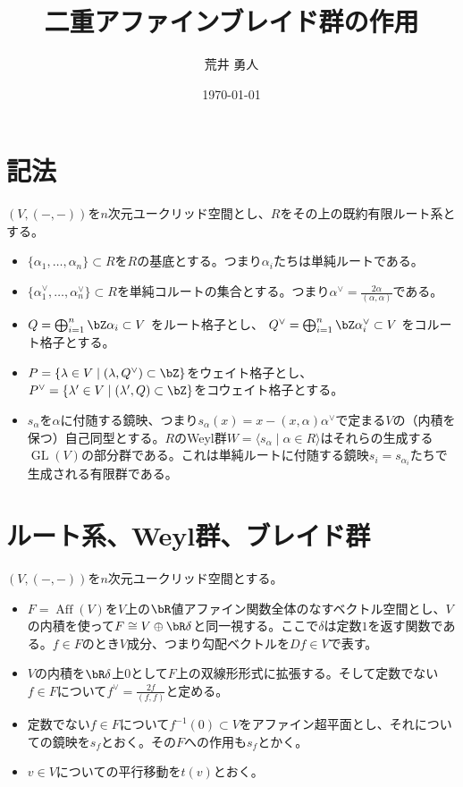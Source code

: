\documentclass[uplatex, a4paper, dvipdfmx]{jsarticle}
\title{二重アファインブレイド群の作用}
\author{荒井 勇人}
\date{\today}
\theoremstyle{definition}
\DeclareMathOperator{\GL}{\mathrm{GL}}
\DeclareMathOperator{\Aff}{\mathrm{Aff}}
\begin{document}
\maketitle


\section{記法}
$(V,(-, -))$を$n$次元ユークリッド空間とし、$R$をその上の既約有限ルート系とする。
\begin{itemize}
    \item $\{\alpha_1, \dots, \alpha_n\} \subset R$を$R$の基底とする。つまり$\alpha_i$たちは単純ルートである。
    \item $\{\alpha_1^\vee, \dots, \alpha_n^\vee\} \subset R$を単純コルートの集合とする。つまり$\alpha^\vee = \frac{2\alpha}{(\alpha, \alpha)}$である。
    \item $Q = \bigoplus_{i = 1}^n \bZ \alpha_i \subset V$ をルート格子とし、 $Q^\vee = \bigoplus_{i = 1}^n \bZ \alpha_i^\vee \subset V$ をコルート格子とする。
    \item $P = \{\lambda \in V \mid (\lambda, Q^\vee) \subset \bZ\}$をウェイト格子とし、$P^\vee = \{\lambda' \in V \mid (\lambda', Q) \subset \bZ\}$をコウェイト格子とする。
    \item $s_\alpha$を$\alpha$に付随する鏡映、つまり$s_\alpha(x) = x - (x, \alpha)\alpha^\vee$で定まる$V$の（内積を保つ）自己同型とする。$R$のWeyl群$W = \langle s_\alpha \mid \alpha \in R \rangle$はそれらの生成する$\GL(V)$の部分群である。これは単純ルートに付随する鏡映$s_i = s_{\alpha_i}$たちで生成される有限群である。
\end{itemize}
\section{ルート系、Weyl群、ブレイド群}
$(V,(-, -))$を$n$次元ユークリッド空間とする。
\begin{itemize}
    \item $F=\Aff(V)$を$V$上の$\bR$値アファイン関数全体のなすベクトル空間とし、$V$の内積を使って$F \cong V \oplus \bR \delta$と同一視する。ここで$\delta$は定数$1$を返す関数である。$f \in F$のとき$V$成分、つまり勾配ベクトルを$Df \in V$で表す。
    \item $V$の内積を$\bR \delta$上$0$として$F$上の双線形形式に拡張する。そして定数でない$f \in F$について$f^\vee = \frac{2f}{(f, f)}$と定める。
    \item 定数でない$f \in F$について$f^{-1}(0) \subset V$をアファイン超平面とし、それについての鏡映を$s_f$とおく。その$F$への作用も$s_f$とかく。
    \item $v \in V$についての平行移動を$t(v)$とおく。
\end{itemize}
\end{document}
